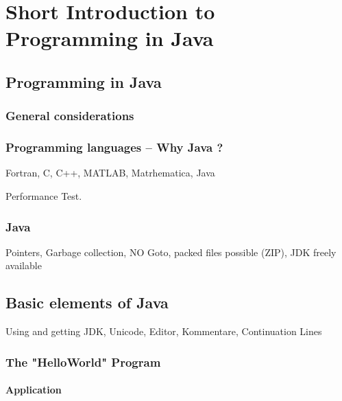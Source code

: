 \chapter{Short Introduction to Programming in Java}

\section{Programming in Java}
\label{sec:Programming}



\subsection{General considerations}
\label{sec:General_considerations}


\subsection{Programming languages -- Why Java ?}
\label{sec:Programming_languages}

Fortran, C, C++, MATLAB, Matrhematica, Java

Performance Test.


\subsection{Java}
\label{sec:Java}
Pointers, Garbage collection, NO Goto, packed files possible (ZIP),
JDK freely available


\section{Basic elements of Java}
\label{sec:Basic_elements_of_Java}
Using and getting JDK,
Unicode, Editor, Kommentare, Continuation Lines

\subsection{The "HelloWorld" Program}
\label{sec:HelloWorld}


\subsubsection{Application}

